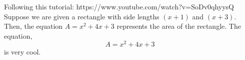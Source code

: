 \documentclass[12]{article} %
\begin{document}
Following this tutorial: https://www.youtube.com/watch?v=SoDv0qhyysQ
\\ %
Suppose we are given a rectangle with side lengths $(x+1)$ and $(x+3)$. Then, the equation $A=x^2+4x+3$ represents the area of the rectangle. %
The equation,
$$A=x^2+4x+3$$
is very cool.\\
\end{document}
